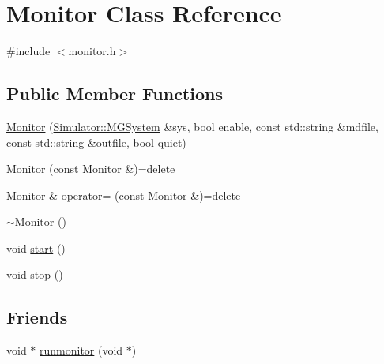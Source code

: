 \hypertarget{class_monitor}{\section{Monitor Class Reference}
\label{class_monitor}
}


{\ttfamily \#include $<$monitor.\+h$>$}

\subsection*{Public Member Functions}
\begin{DoxyCompactItemize}
\item 
\hyperlink{class_monitor_a692f76663d14f77be03417dd082cda2c}{Monitor} (\hyperlink{class_simulator_1_1_m_g_system}{Simulator\+::\+M\+G\+System} \&sys, bool enable, const std\+::string \&mdfile, const std\+::string \&outfile, bool quiet)
\item 
\hyperlink{class_monitor_a18b1d3d7c75c00ce6f4be4550ed37385}{Monitor} (const \hyperlink{class_monitor}{Monitor} \&)=delete
\item 
\hyperlink{class_monitor}{Monitor} \& \hyperlink{class_monitor_a0246757b43acffba685c382a381a7b51}{operator=} (const \hyperlink{class_monitor}{Monitor} \&)=delete
\item 
\hyperlink{class_monitor_a64aba8195effc068092ddea5a71e8176}{$\sim$\+Monitor} ()
\item 
void \hyperlink{class_monitor_a6e42d978d04866d6501fbbec981b6b75}{start} ()
\item 
void \hyperlink{class_monitor_a13fb20dc3bd5c8739f5a820cf7433cd8}{stop} ()
\end{DoxyCompactItemize}
\subsection*{Friends}
\begin{DoxyCompactItemize}
\item 
void $\ast$ \hyperlink{class_monitor_a5869e75d1fbbf57f3c3b1b468a23093b}{runmonitor} (void $\ast$)
\end{DoxyCompactItemize}



